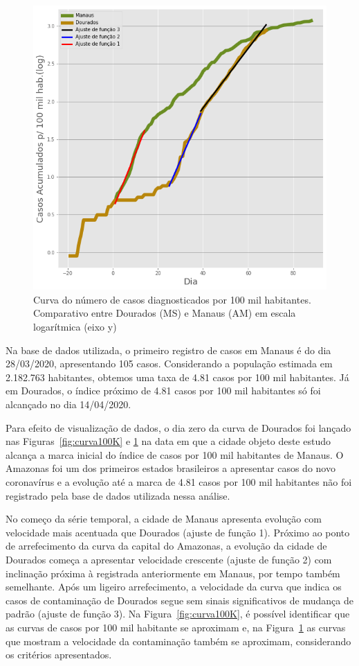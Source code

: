 \documentclass[12pt]{article}
\begin{document}
\begin{figure}[!htb]
  \centering
  \includegraphics[width=.6\textwidth]{figs/Dourados_Manaus_casos_log.png}
  \caption{Curva do número de casos diagnosticados por 100 mil habitantes. Comparativo entre Dourados (MS) e Manaus (AM) em escala logarítmica (eixo y)}
  \label{fig:curva100KLog}
  \end{figure}

Na base de dados utilizada, o primeiro registro de casos em Manaus é do dia 28/03/2020, apresentando 105 casos. Considerando a população estimada em 2.182.763 habitantes, obtemos uma taxa de 4.81 casos por 100 mil habitantes. Já em Dourados, o índice próximo de 4.81 casos por 100 mil habitantes só foi alcançado no dia 14/04/2020.

Para efeito de visualização de dados, o dia zero da curva de Dourados foi lançado nas Figuras~\ref{fig:curva100K} e \ref{fig:curva100KLog} na data em que a cidade objeto deste estudo alcança a marca inicial do índice de casos por 100 mil habitantes de Manaus. O Amazonas foi um dos primeiros estados brasileiros a apresentar casos do novo coronavírus e a evolução até a marca de 4.81 casos por 100 mil habitantes
não foi registrado pela base de dados utilizada nessa análise. 

No começo da série temporal, a cidade de Manaus apresenta evolução com velocidade mais acentuada que Dourados (ajuste de função 1). Próximo ao ponto de arrefecimento da curva da capital do Amazonas, a evolução da cidade de Dourados começa a apresentar velocidade crescente (ajuste de função 2) com inclinação próxima à registrada anteriormente em Manaus, por tempo também semelhante. Após um ligeiro arrefecimento, a velocidade da curva que indica os casos de contaminação de Dourados segue sem sinais significativos de mudança de padrão (ajuste de função 3). Na Figura~\ref{fig:curva100K}, é possível identificar que as curvas de casos por 100 mil habitante se aproximam e, na Figura~\ref{fig:curva100KLog} as curvas que mostram a velocidade da contaminação também se aproximam, considerando os critérios apresentados.
\end{document}
